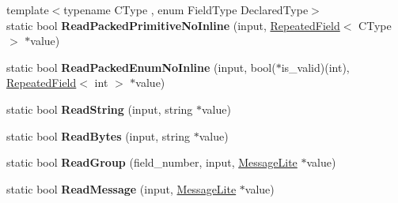 \begin{DoxyCompactItemize}
\item 
\mbox{\label{classgoogle_1_1protobuf_1_1internal_1_1WireFormatLite_a91104beb17c682c6d516a046499961cd}} 
{\footnotesize template$<$typename C\+Type , enum Field\+Type Declared\+Type$>$ }\\static bool {\bfseries Read\+Packed\+Primitive\+No\+Inline} (input, \hyperlink{classgoogle_1_1protobuf_1_1RepeatedField}{Repeated\+Field}$<$ C\+Type $>$ $\ast$value)
\item 
\mbox{\label{classgoogle_1_1protobuf_1_1internal_1_1WireFormatLite_a77be9cabe6a1914a76d82b079eea77c9}} 
static bool {\bfseries Read\+Packed\+Enum\+No\+Inline} (input, bool($\ast$is\+\_\+valid)(int), \hyperlink{classgoogle_1_1protobuf_1_1RepeatedField}{Repeated\+Field}$<$ int $>$ $\ast$value)
\item 
\mbox{\label{classgoogle_1_1protobuf_1_1internal_1_1WireFormatLite_a361909342c353aeb0ec1ae21011c782d}} 
static bool {\bfseries Read\+String} (input, string $\ast$value)
\item 
\mbox{\label{classgoogle_1_1protobuf_1_1internal_1_1WireFormatLite_ac3a1b43bcd047a7cc1545015b6355458}} 
static bool {\bfseries Read\+Bytes} (input, string $\ast$value)
\item 
\mbox{\label{classgoogle_1_1protobuf_1_1internal_1_1WireFormatLite_a1bb59eccb61294feaf89548ce79eaedb}} 
static bool {\bfseries Read\+Group} (field\+\_\+number, input, \hyperlink{classgoogle_1_1protobuf_1_1MessageLite}{Message\+Lite} $\ast$value)
\item 
\mbox{\label{classgoogle_1_1protobuf_1_1internal_1_1WireFormatLite_a1497cefd585e58a16085b601aec64799}} 
static bool {\bfseries Read\+Message} (input, \hyperlink{classgoogle_1_1protobuf_1_1MessageLite}{Message\+Lite} $\ast$value)
\item 
\mbox{\label{classgoogle_1_1protobuf_1_1internal_1_1WireFormatLite_aec6941a8ac095e8f91480ee801edc487}} 

\end{DoxyCompactItemize}
